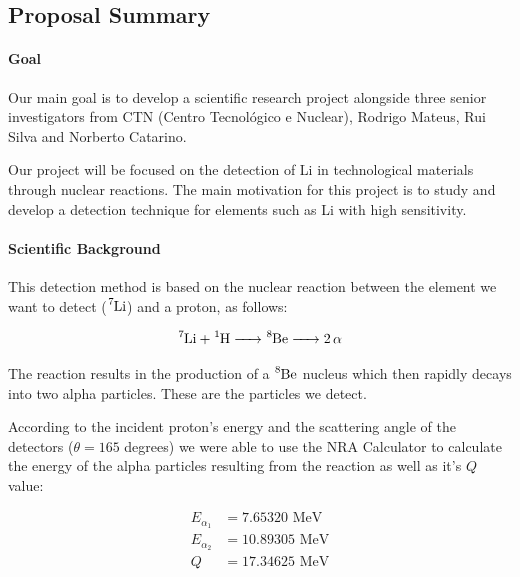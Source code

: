 \documentclass{article}
\begin{document}
\begin{multicols}{2}


\section{Proposal Summary}

\paragraph{Goal}

Our main goal is to develop a scientific research project alongside three senior investigators from CTN
(Centro Tecnológico e Nuclear), Rodrigo Mateus, Rui Silva and Norberto Catarino. 

Our project will be focused on the detection of Li in technological materials through nuclear reactions.
The main motivation for this project is to study and develop a detection technique for elements such as Li with
high sensitivity.

\paragraph{Scientific Background}

This detection method is based on the nuclear reaction between the element we want to detect ($\ce{^7Li}$) and a proton, as follows:

\begin{equation}
  \ce{^7Li + ^1H -> ^8Be -> 2\alpha}
  \label{eq:reaction}
\end{equation}

The reaction results in the production of a $\ce{^8Be}$ nucleus which then rapidly decays into two alpha particles. These are the particles we detect.

According to the incident proton's energy and the scattering angle of the detectors ($\theta = 165 $ degrees) we were able to use the NRA Calculator \cite{NRAEnergyCalc} to calculate the energy of the alpha particles resulting from the reaction as well as it's $Q$ value:

\begin{equation}
\begin{split}
  E_{\alpha_1} &= 7.65320 \text{ MeV} \\
  E_{\alpha_2} &= 10.89305 \text{ MeV} \\
  Q &= 17.34625 \text{ MeV}
\end{split}
\label{eq:energies}
\end{equation}


\end{multicols}
\end{document}
